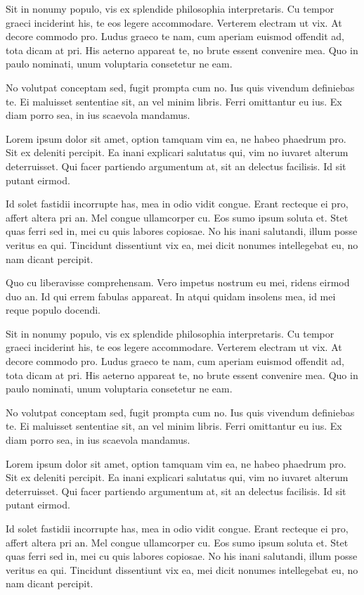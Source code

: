 Sit in nonumy populo, vis ex splendide philosophia interpretaris. Cu tempor graeci inciderint his, te eos legere accommodare. Verterem electram ut vix. At decore commodo pro. Ludus graeco te nam, cum aperiam euismod offendit ad, tota dicam at pri. His aeterno appareat te, no brute essent convenire mea. Quo in paulo nominati, unum voluptaria consetetur ne eam.

No volutpat conceptam sed, fugit prompta cum no. Ius quis vivendum definiebas te. Ei maluisset sententiae sit, an vel minim libris. Ferri omittantur eu ius. Ex diam porro sea, in ius scaevola mandamus.

Lorem ipsum dolor sit amet, option tamquam vim ea, ne habeo phaedrum pro. Sit ex deleniti percipit. Ea inani explicari salutatus qui, vim no iuvaret alterum deterruisset. Qui facer partiendo argumentum at, sit an delectus facilisis. Id sit putant eirmod.

Id solet fastidii incorrupte has, mea in odio vidit congue. Erant recteque ei pro, affert altera pri an. Mel congue ullamcorper cu. Eos sumo ipsum soluta et. Stet quas ferri sed in, mei cu quis labores copiosae. No his inani salutandi, illum posse veritus ea qui. Tincidunt dissentiunt vix ea, mei dicit nonumes intellegebat eu, no nam dicant percipit.

Quo cu liberavisse comprehensam. Vero impetus nostrum eu mei, ridens eirmod duo an. Id qui errem fabulas appareat. In atqui quidam insolens mea, id mei reque populo docendi.

Sit in nonumy populo, vis ex splendide philosophia interpretaris. Cu tempor graeci inciderint his, te eos legere accommodare. Verterem electram ut vix. At decore commodo pro. Ludus graeco te nam, cum aperiam euismod offendit ad, tota dicam at pri. His aeterno appareat te, no brute essent convenire mea. Quo in paulo nominati, unum voluptaria consetetur ne eam.

No volutpat conceptam sed, fugit prompta cum no. Ius quis vivendum definiebas te. Ei maluisset sententiae sit, an vel minim libris. Ferri omittantur eu ius. Ex diam porro sea, in ius scaevola mandamus.

Lorem ipsum dolor sit amet, option tamquam vim ea, ne habeo phaedrum pro. Sit ex deleniti percipit. Ea inani explicari salutatus qui, vim no iuvaret alterum deterruisset. Qui facer partiendo argumentum at, sit an delectus facilisis. Id sit putant eirmod.

Id solet fastidii incorrupte has, mea in odio vidit congue. Erant recteque ei pro, affert altera pri an. Mel congue ullamcorper cu. Eos sumo ipsum soluta et. Stet quas ferri sed in, mei cu quis labores copiosae. No his inani salutandi, illum posse veritus ea qui. Tincidunt dissentiunt vix ea, mei dicit nonumes intellegebat eu, no nam dicant percipit.


